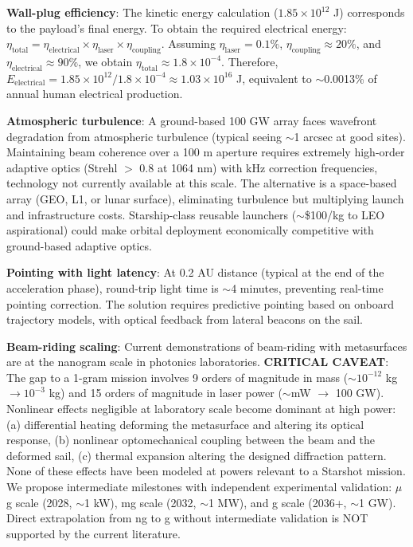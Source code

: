 \documentclass[11pt,a4paper,onecolumn]{article}
\begin{document}
\textbf{Wall-plug efficiency}: The kinetic energy calculation ($1.85\times10^{12}$ J) corresponds to the payload's final energy. To obtain the required electrical energy: $\eta_{\text{total}} = \eta_{\text{electrical}} \times \eta_{\text{laser}} \times \eta_{\text{coupling}}$. Assuming $\eta_{\text{laser}} = 0.1\%$, $\eta_{\text{coupling}} \approx 20\%$, and $\eta_{\text{electrical}} \approx 90\%$, we obtain $\eta_{\text{total}} \approx 1.8\times10^{-4}$. Therefore, $E_{\text{electrical}} = 1.85\times10^{12} / 1.8\times10^{-4} \approx 1.03\times10^{16}$ J, equivalent to $\sim$0.0013\% of annual human electrical production.

\textbf{Atmospheric turbulence}: A ground-based 100 GW array faces wavefront degradation from atmospheric turbulence (typical seeing $\sim$1 arcsec at good sites). Maintaining beam coherence over a 100 m aperture requires extremely high-order adaptive optics (Strehl $>$ 0.8 at 1064 nm) with kHz correction frequencies, technology not currently available at this scale. The alternative is a space-based array (GEO, L1, or lunar surface), eliminating turbulence but multiplying launch and infrastructure costs. Starship-class reusable launchers ($\sim$\$100/kg to LEO aspirational) could make orbital deployment economically competitive with ground-based adaptive optics.

\textbf{Pointing with light latency}: At 0.2 AU distance (typical at the end of the acceleration phase), round-trip light time is $\sim$4 minutes, preventing real-time pointing correction. The solution requires predictive pointing based on onboard trajectory models, with optical feedback from lateral beacons on the sail.

\textbf{Beam-riding scaling}: Current demonstrations of beam-riding with metasurfaces are at the nanogram scale in photonics laboratories. \textbf{CRITICAL CAVEAT}: The gap to a 1-gram mission involves 9 orders of magnitude in mass ($\sim10^{-12}$ kg $\rightarrow 10^{-3}$ kg) and 15 orders of magnitude in laser power ($\sim$mW $\rightarrow$ 100 GW). Nonlinear effects negligible at laboratory scale become dominant at high power: (a) differential heating deforming the metasurface and altering its optical response, (b) nonlinear optomechanical coupling between the beam and the deformed sail, (c) thermal expansion altering the designed diffraction pattern. None of these effects have been modeled at powers relevant to a Starshot mission. We propose intermediate milestones with independent experimental validation: $\mu$g scale (2028, $\sim$1 kW), mg scale (2032, $\sim$1 MW), and g scale (2036+, $\sim$1 GW). Direct extrapolation from ng to g without intermediate validation is NOT supported by the current literature.
\end{document}
